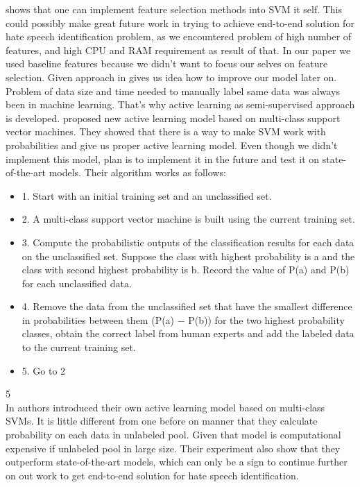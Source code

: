 \documentclass[10pt, a4paper]{article}
\begin{document}
\cite{ChenSVMFeatures} shows that one can implement feature selection methods into SVM it self. This could possibly make great future work in trying to achieve end-to-end solution for hate speech identification problem, as we encountered problem of high number of features, and high CPU and RAM requirement as result of that. In our paper we used baseline features because we didn't want to focus our selves on feature selection. Given approach in \cite{ChenSVMFeatures} gives us idea how to improve our model later on.
\\Problem of data size and time needed to manually label same data was always been in machine learning. That's why active learning as semi-supervised approach is developed. \cite{LuoALPlankton} proposed new active learning model based on multi-class support vector machines. They showed that there is a way to make SVM work with probabilities and give us proper active learning model. Even though we didn't implement this model, plan is to implement it in the future and test it on state-of-the-art models. Their algorithm works as follows:
\begin{itemize}
	\item 1. Start with an initial training set and an unclassified set.
	\item 2. A multi-class support vector machine is built using the current training set.
	\item 3. Compute the probabilistic outputs of the classification results for each data on the unclassified set. Suppose the class with highest probability is a and the class with second highest probability is b. Record the value of P(a) and P(b) for each unclassified data.
	\item 4. Remove the data from the unclassified set that have the smallest difference in probabilities between them (P(a) − P(b)) for the two highest probability classes, obtain the correct label from human experts and add the labeled data to the current training set.
	\item 5. Go to 2
\end{itemize}
5\\In \cite{YangMultiClassAL} authors introduced their own active learning model based on multi-class SVMs. It is little different from one before on manner that they calculate probability on each data in unlabeled pool. Given that model is computational expensive if unlabeled pool in large size. Their experiment also show that they outperform state-of-the-art models, which can only be a sign to continue further on out work to get end-to-end solution for hate speech identification.
\end{document}
